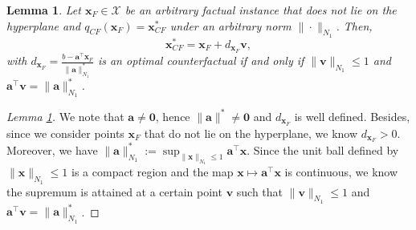 \documentclass[10pt,a4paper]{amsart}
\newtheorem{lemma}{Lemma}
\begin{document}
\begin{lemma}\label{lem:CF_direction}
Let $\bm{x}_F\in \mathcal X$ be an arbitrary factual instance that does not lie on the hyperplane and $q_{CF}(\bm{x}_F) = \bm{x}_{CF}^*$ under an arbitrary norm $ \| \cdot \|_{N_1}$. Then,
\begin{equation}\label{eq:CF_direction}
        \bm{x}_{CF}^*=\bm{x}_F+d_{\bm{x}_F}\bm{v},
    \end{equation}
with $d_{\bm{x}_F}=\frac{b-\bm{a}^{\top}\bm{x}_F}{\|\bm{a}\|_{N_1}^*}$ is an optimal counterfactual if and only if $\|\bm{v}\|_{N_1}\leq 1$ and $\bm{a}^{\top}\bm{v}=\|\bm{a}\|_{N_1}^*$.
\end{lemma}

\begin{proof}[Lemma \ref{lem:CF_direction}]
    We note that $\bm{a}\neq\bm{0}$, hence $\|\bm{a}\|^*\neq\bm{0}$ and $d_{\bm{x}_F}$ is well defined. Besides, since we consider points $\bm{x}_F$ that do not lie on the hyperplane, we know $d_{\bm{x}_F}>0$. Moreover, we have $\|\bm{a}\|_{N_1}^*:=\sup_{\|\bm{x}\|_{N_1}\leq 1}\bm{a}^{\top}\bm{x}$. Since the unit ball defined by $\|\bm{x}\|_{N_1}\leq 1$ is a compact region and the map $\bm{x} \mapsto \bm{a}^{\top}\bm{x}$ is continuous, we know the supremum is attained at a certain point $\bm{v}$ such that $\|\bm{v}\|_{N_1}\leq 1$ and $\bm{a}^{\top}\bm{v}=\|\bm{a}\|_{N_1}^*$.


\end{proof}
\end{document}
